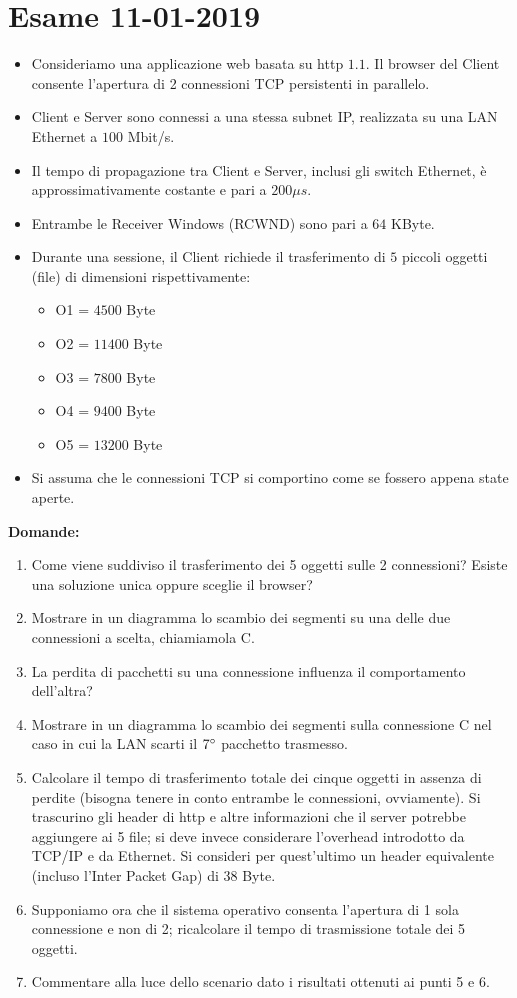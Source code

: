 \documentclass[10pt,a4paper]{article}
\begin{document}
	\newpage

	\section{Esame 11-01-2019}
	\begin{itemize}
		\item Consideriamo una applicazione web basata su http $1.1.$ Il browser del Client consente l'apertura di 2 connessioni TCP persistenti in parallelo. 
		\item Client e Server sono connessi a una stessa subnet IP, realizzata su una LAN Ethernet a $100$ Mbit/s. 
		\item Il tempo di propagazione tra Client e Server, inclusi gli switch Ethernet, è approssimativamente costante e pari a $200 \mu s$. 
		\item Entrambe le Receiver Windows (RCWND) sono pari a $64$ KByte.
		\item Durante una sessione, il Client richiede il trasferimento di $5$ piccoli oggetti (file) di dimensioni rispettivamente:
			\begin{itemize}
				\item O1 = $4500$ Byte
				\item O2 = $11400$ Byte
				\item O3 = $7800$ Byte
				\item O4 = $9400$ Byte
				\item O5 = $13200$ Byte
			\end{itemize}
		\item Si assuma che le connessioni TCP si comportino come se fossero appena state aperte.
	\end{itemize}
	\textbf{Domande:}
	\begin{enumerate}
		\item Come viene suddiviso il trasferimento dei 5 oggetti sulle 2 connessioni? Esiste una soluzione unica oppure sceglie il browser?
		\item Mostrare in un diagramma lo scambio dei segmenti su una delle due connessioni a scelta, chiamiamola C.
		\item La perdita di pacchetti su una connessione influenza il comportamento dell'altra?
		\item Mostrare in un diagramma lo scambio dei segmenti sulla connessione C nel caso in cui la LAN scarti il $7 \degree$ pacchetto trasmesso.
		\item Calcolare il tempo di trasferimento totale dei cinque oggetti in assenza di perdite (bisogna tenere in conto entrambe le connessioni, ovviamente). Si trascurino gli header di http e altre informazioni che il server potrebbe aggiungere ai 5 file; si deve invece considerare l'overhead introdotto da TCP/IP e da Ethernet. Si consideri per quest'ultimo un header 
		equivalente (incluso l'Inter Packet Gap) di $38$ Byte.
		\item Supponiamo ora che il sistema operativo consenta l'apertura di 1 sola connessione e non di 2; ricalcolare il tempo di trasmissione totale dei 5 oggetti.
		\item Commentare alla luce dello scenario dato i risultati ottenuti ai punti 5 e 6.
	\end{enumerate}
\end{document}
